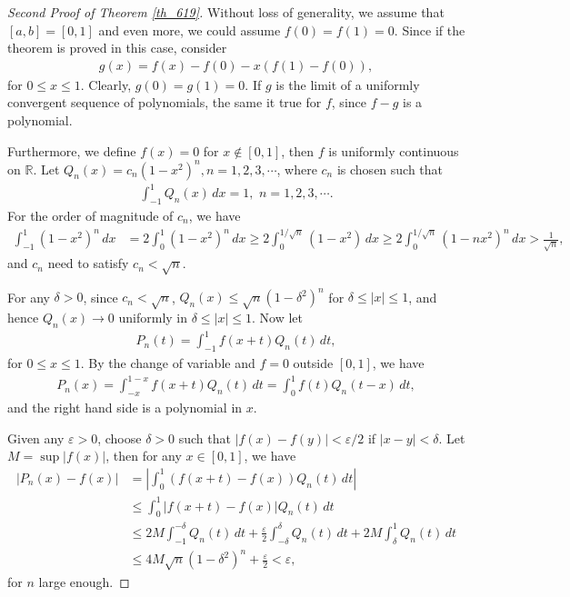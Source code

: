 \documentclass[10pt]{book}
\theoremstyle{definition}
\numberwithin{equation}{chapter}
\begin{document}
\begin{proof}[Second Proof of Theorem \ref{th_619}]
Without loss of generality, we assume that $[a,b] = [0,1]$ and even more, we could assume $f(0) = f(1) = 0$. Since if the theorem is proved in this case, consider
\begin{align*}
    g(x) = f(x) - f(0) - x \left(f(1) - f(0)\right),
\end{align*}
for $0 \leq x \leq 1$. Clearly, $g(0) = g(1) = 0$. If $g$ is the limit of a uniformly convergent sequence of polynomials, the same it true for $f$, since $f - g$ is a polynomial.

Furthermore, we define $f(x) = 0$ for $x \notin [0,1]$, then $f$ is uniformly continuous on $\mathbb{R}$. Let $Q_n(x) = c_n (1 - x^2)^n, n = 1,2,3,\cdots$, where $c_n$ is chosen such that
\begin{align*}
    \int^1_{-1} Q_n(x) \,dx = 1, \,\, n = 1,2,3,\cdots.
\end{align*}
For the order of magnitude of $c_n$, we have
\begin{align*}
    \int^1_{-1} (1 - x^2)^n \,dx & = 2 \int^1_0 (1 - x^2)^n \,dx \geq 2 \int^{1/\sqrt{n}}_0 (1 - x^2) \,dx \geq 2 \int^{1/\sqrt{n}}_0 (1 - nx^2)^n \,dx > \frac{1}{\sqrt{n}},
\end{align*}
and $c_n$ need to satisfy $c_n < \sqrt{n}$. 

For any $\delta > 0$, since $c_n < \sqrt{n}$, $Q_n(x) \leq \sqrt{n} (1 - \delta^2)^n$ for $\delta \leq \left|x\right| \leq 1$, and hence $Q_n(x) \to 0$ uniformly in $\delta \leq \left|x\right| \leq 1$. Now let
\begin{align*}
    P_n(t) = \int^1_{-1} f(x+t) Q_n(t) \,dt,
\end{align*}
for $0 \leq x \leq 1$. By the change of variable and $f = 0$ outside $[0,1]$, we have
\begin{align*}
    P_n(x) = \int^{1-x}_{-x} f(x+t) Q_n(t) \,dt = \int^1_0 f(t) Q_n(t - x) \,dt,
\end{align*}
and the right hand side is a polynomial in $x$. 

Given any $\varepsilon > 0$, choose $\delta > 0$ such that $\left|f(x) - f(y)\right| < \varepsilon/2$ if $\left|x - y\right| < \delta$. Let $M = \sup \left|f(x)\right|$, then for any $x \in [0,1]$, we have
\begin{align*}
    \left|P_n(x) - f(x)\right| & = \left|\int^1_0 \left(f(x+t) - f(x)\right) Q_n(t) \,dt \right| \\
    & \leq \int^1_0 \left|f(x+t) - f(x)\right| Q_n(t) \,dt \\
    & \leq 2M \int^{-\delta}_{-1} Q_n(t) \,dt + \frac{\varepsilon}{2} \int^{\delta}_{-\delta} Q_n(t) \,dt + 2M \int^1_{\delta} Q_n(t) \,dt \\
    & \leq 4M \sqrt{n} (1 - \delta^2)^n + \frac{\varepsilon}{2} < \varepsilon,
\end{align*}
for $n$ large enough.
\end{proof}
\end{document}

